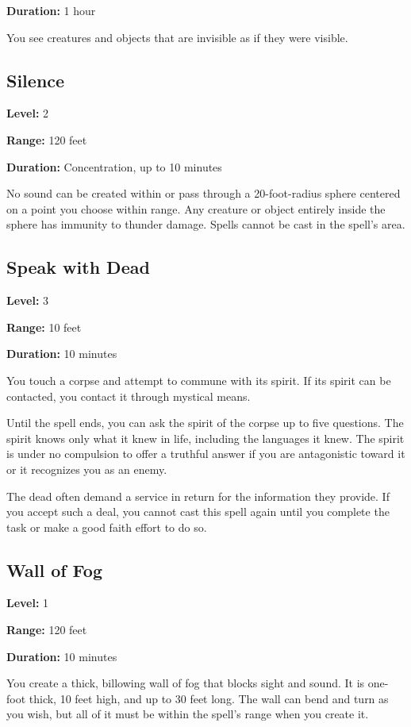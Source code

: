 \documentclass[12pt,letterpaper,twocolumn,openany,nodeprecatedcode,bg=none]{dndbook}
\let\oldsubsection\subsection
\renewcommand{\subsection}[1]{%
  \needspace{5\baselineskip}%
  \oldsubsection{#1}%
}
\begin{document}
\textbf{Duration:} 1 hour

You see creatures and objects that are invisible as if they were
visible.

\subsection{Silence}\label{silence}

\textbf{Level:} 2

\textbf{Range:} 120 feet

\textbf{Duration:} Concentration, up to 10 minutes

No sound can be created within or pass through a 20-foot-radius sphere
centered on a point you choose within range. Any creature or object
entirely inside the sphere has immunity to thunder damage. Spells cannot
be cast in the spell's area.

\newpage

\subsection{Speak with Dead}\label{speak-with-dead}

\textbf{Level:} 3

\textbf{Range:} 10 feet

\textbf{Duration:} 10 minutes

You touch a corpse and attempt to commune with its spirit. If its spirit
can be contacted, you contact it through mystical means.

Until the spell ends, you can ask the spirit of the corpse up to five
questions. The spirit knows only what it knew in life, including the
languages it knew. The spirit is under no compulsion to offer a truthful
answer if you are antagonistic toward it or it recognizes you as an
enemy.

The dead often demand a service in return for the information they
provide. If you accept such a deal, you cannot cast this spell again
until you complete the task or make a good faith effort to do so.

\subsection{Wall of Fog}\label{wall-of-fog}

\textbf{Level:} 1

\textbf{Range:} 120 feet

\textbf{Duration:} 10 minutes

You create a thick, billowing wall of fog that blocks sight and sound.
It is one-foot thick, 10 feet high, and up to 30 feet long. The wall can
bend and turn as you wish, but all of it must be within the spell's
range when you create it.
\end{document}
